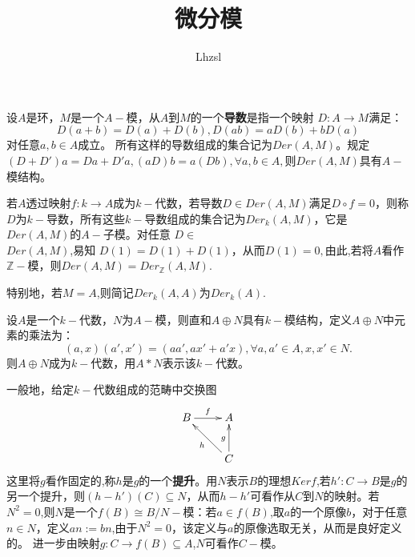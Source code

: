 \documentclass[UTF8]{article}
\title{\textbf{\huge{微分模}}}
\author{Lhzsl}
\date{}
\begin{document}
	\maketitle
	设$A$是环，$M$是一个$A-$模，从$A$到$M$的一个\textbf{导数}是指一个映射
	$D:A\rightarrow M$满足：
	$$D(a+b)=D(a)+D(b),D(ab)=aD(b)+bD(a)$$
	对任意$a,b\in A$成立。
	所有这样的导数组成的集合记为$Der(A,M)$。规定$(D+D')a=Da+D'a,(aD)b=a(Db),\forall a,b \in A,$则$Der(A,M)$具有$A-$模结构。
	
	若$A$透过映射$f:k\rightarrow A$成为$k-$代数，若导数$D\in Der(A,M)$满足$D\circ f=0$，则称$D$为$k-$导数，所有这些$k-$导数组成的集合记为$Der_{k}(A,M)$，它是$Der(A,M)$的$A-$子模。对任意
	$D\in $ \\
	$Der(A,M)$,易知
	$D(1)=D(1)+D(1)$，从而$D(1)=0,$由此,若将$A$看作$\mathbb{Z}-$模，则$Der(A,M)=Der_{\mathbb{Z}}(A,M).$
	
	特别地，若$M=A$,则简记$Der_{k}(A,A)$为$Der_{k}(A).$
	
	设$A$是一个$k-$代数，$N$为$A-$模，则直和$A\oplus N$具有$k-$模结构，定义$A\oplus N$中元素的乘法为：
	$$
	(a,x)(a',x')=(aa',ax'+a'x),\forall a,a'\in A,x,x'\in N.
	$$
	则$A\oplus N$成为$k-$代数，用$A*N$表示该$k-$代数。
	
	
	一般地，给定$k-$代数组成的范畴中交换图
	$$
	\xymatrix{
B\ar[r]^{f}&A\\
&C\ar[lu]^{h}\ar[u]^{g}	
}
	$$
这里将$g$看作固定的,称$h$是$g$的一个\textbf{提升}。用$N$表示$B$的理想$Kerf$,若$h':C\rightarrow B$是$g$的另一个提升，则$(h-h')(C)\subseteq N$，从而$h-h'$可看作从$C$到$N$的映射。若$N^2=0$,则$N$是一个$f(B)\cong B/N-$模：若$a\in f(B)$,取$a$的一个原像$b$，对于任意$n\in N$，定义$an:=bn$,由于$N^2=0$，该定义与$a$的原像选取无关，从而是良好定义的。
进一步由映射$g:C\rightarrow f(B)\subseteq A$,$N$可看作$C-$模。
\end{document}
